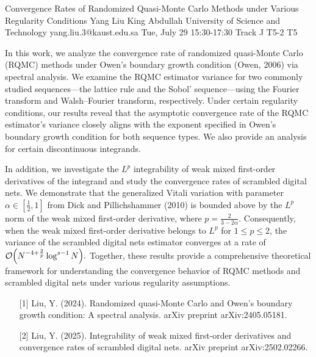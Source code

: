 \begin{talk}
  {Convergence Rates of Randomized Quasi-Monte Carlo Methods under Various Regularity Conditions}%
  {Yang Liu}%
  {King Abdullah University of Science and Technology}%
  {yang.liu.3@kaust.edu.sa}%
  {}%
  {}%
  {Tue, July 29 15:30-17:30 Track J}%
  {T5-2}%
  {T5}%
  
				
        
        In this work, we analyze the convergence rate of randomized quasi-Monte Carlo (RQMC) methods under Owen's boundary growth condition (Owen, 2006) via spectral analysis. We examine the RQMC estimator variance for two commonly studied sequences—the lattice rule and the Sobol' sequence—using the Fourier transform and Walsh–Fourier transform, respectively. Under certain regularity conditions, our results reveal that the asymptotic convergence rate of the RQMC estimator's variance closely aligns with the exponent specified in Owen's boundary growth condition for both sequence types. We also provide an analysis for certain discontinuous integrands.

        In addition, we investigate the \(L^p\) integrability of weak mixed first-order derivatives of the integrand and study the convergence rates of scrambled digital nets. We demonstrate that the generalized Vitali variation with parameter \(\alpha \in \left[\frac{1}{2}, 1\right]\) from Dick and Pillichshammer (2010) is bounded above by the \(L^p\) norm of the weak mixed first-order derivative, where \(p = \frac{2}{3-2\alpha}\). Consequently, when the weak mixed first-order derivative belongs to \(L^p\) for \(1 \leq p \leq 2\), the variance of the scrambled digital nets estimator converges at a rate of
        \(
        \mathcal{O}\Bigl(N^{-4+\frac{2}{p}} \log^{s-1} N\Bigr).
        \)
        Together, these results provide a comprehensive theoretical framework for understanding the convergence behavior of RQMC methods and scrambled digital nets under various regularity assumptions.
        

\medskip

\begin{enumerate}
	\item[{[1]}] Liu, Y. (2024). Randomized quasi-Monte Carlo and Owen's boundary growth condition: A spectral analysis. arXiv preprint arXiv:2405.05181.
	\item[{[2]}] Liu, Y. (2025). Integrability of weak mixed first-order derivatives and convergence rates of scrambled digital nets. arXiv preprint arXiv:2502.02266.
\end{enumerate}


\end{talk}

